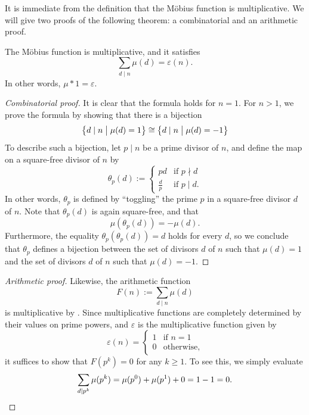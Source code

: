 It is immediate from the definition that the M\"obius function is multiplicative. We will give two proofs of the following theorem: a combinatorial and an arithmetic proof.

\begin{theorem}\label{theorem:inverse-mobius-function}
  The M\"obius function is multiplicative, and it satisfies
  \begin{equation*}
    \sum_{d\mid n}\mu(d) = \varepsilon(n).
  \end{equation*}
  In other words, $\mu\ast 1=\varepsilon$.
\end{theorem}

\begin{proof}[Combinatorial proof]
  It is clear that the formula holds for $n=1$. For $n>1$, we prove the formula by showing that there is a bijection
  \begin{equation*}
    \big\{d\mid n \bigm| \mu(d)=1 \big\} \cong \big\{d\mid n \bigm| \mu(d)=-1 \big\}
  \end{equation*}
  To describe such a bijection, let $p\mid n$ be a prime divisor of $n$, and define the map on a square-free divisor of $n$ by
  \begin{equation*}
    \theta_p(d) :=
    \begin{cases}
      pd & \text{if $p\nmid d$}\\
      \tfrac{d}{p} & \text{if $p\mid d$}.
    \end{cases}
  \end{equation*}
  In other words, $\theta_p$ is defined by \enquote{toggling} the prime $p$ in a square-free divisor $d$ of $n$. Note that $\theta_p(d)$ is again square-free, and that
  \begin{equation*}
    \mu(\theta_p(d))=-\mu(d).
  \end{equation*}
  Furthermore, the equality $\theta_p(\theta_p(d))=d$ holds for every $d$, so we conclude that $\theta_p$ defines a bijection between the set of divisors $d$ of $n$ such that $\mu(d)=1$ and the set of divisors $d$ of $n$ such that $\mu(d)=-1$.
\end{proof}

\begin{proof}[Arithmetic proof]
  Likewise, the arithmetic function
  \begin{equation*}
    F(n) := \sum_{d\mid n}\mu(d)
  \end{equation*}
  is multiplicative by . Since multiplicative functions are completely determined by their values on prime powers, and $\varepsilon$ is the multiplicative function given by
  \begin{equation*}
    \varepsilon(n) =
    \begin{cases}
      1 & \text{if }n=1\\
      0 & \text{otherwise,}
    \end{cases}
  \end{equation*}
  it suffices to show that $F(p^k)=0$ for any $k\geq 1$. To see this, we simply evaluate
  \begin{equation*}
    \sum_{d\mid p^k}\mu(p^k)=\mu(p^0)+\mu(p^1)+0 = 1-1=0.\qedhere
  \end{equation*}
\end{proof}

